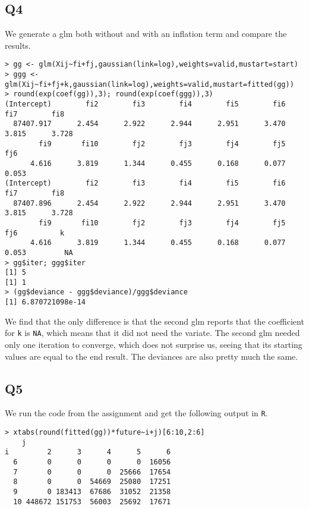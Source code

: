 \documentclass[11pt]{article}
\begin{document}
\subsection*{Q4}

We generate a glm both without and with an inflation term and compare the results.

\begin{verbatim}
> gg <- glm(Xij~fi+fj,gaussian(link=log),weights=valid,mustart=start)
> ggg <- glm(Xij~fi+fj+k,gaussian(link=log),weights=valid,mustart=fitted(gg))
> round(exp(coef(gg)),3); round(exp(coef(ggg)),3)
(Intercept)        fi2        fi3        fi4        fi5        fi6        fi7        fi8 
  87407.917      2.454      2.922      2.944      2.951      3.470      3.815      3.728 
        fi9       fi10        fj2        fj3        fj4        fj5        fj6 
      4.616      3.819      1.344      0.455      0.168      0.077      0.053 
(Intercept)        fi2        fi3        fi4        fi5        fi6        fi7        fi8 
  87407.896      2.454      2.922      2.944      2.951      3.470      3.815      3.728 
        fi9       fi10        fj2        fj3        fj4        fj5        fj6          k 
      4.616      3.819      1.344      0.455      0.168      0.077      0.053         NA 
> gg$iter; ggg$iter
[1] 5
[1] 1
> (gg$deviance - ggg$deviance)/ggg$deviance
[1] 6.870721098e-14
\end{verbatim}

We find that the only difference is that the second glm reports that the coefficient for \verb|k| is \verb|NA|, which means that it did not need the variate. The second glm needed only one iteration to converge, which does not surprise us, seeing that its starting values are equal to the end result. The deviances are also pretty much the same. 

\subsection*{Q5}

We run the code from the assignment and get the following output in \verb|R|.

\begin{verbatim}
> xtabs(round(fitted(gg))*future~i+j)[6:10,2:6]
    j
i         2      3      4      5      6
  6       0      0      0      0  16056
  7       0      0      0  25666  17654
  8       0      0  54669  25080  17251
  9       0 183413  67686  31052  21358
  10 448672 151753  56003  25692  17671
\end{verbatim}
\end{document}
